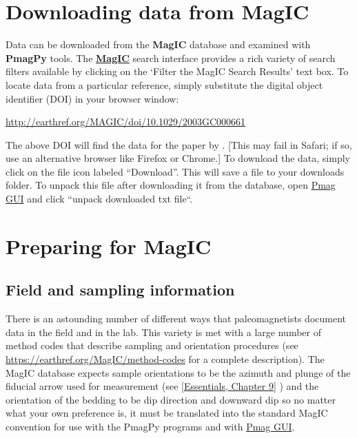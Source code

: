 \documentclass[11pt]{book}
\begin{document}
{

\section{Downloading data from {\bf MagIC}}

Data can be downloaded from the {\bf MagIC} database and examined with {\bf PmagPy} tools.   The \href{http://earthref.org/MAGIC/search/}{\bf MagIC} search interface provides a rich variety of search filters available by clicking on the `Filter the MagIC Search Results' text box.    To locate data from a particular reference,  simply substitute the digital object identifier (DOI) in your browser window:

\href{http://earthref.org/MAGIC/doi/10.1029/2003GC000661}{http://earthref.org/MAGIC/doi/10.1029/2003GC000661}

\noindent The above DOI will find the data for the paper by \cite{tauxe04b}.  [This may fail in Safari; if so, use an alternative browser like Firefox or Chrome.]     To download the data, simply click on the file icon labeled ``Download''.  This will save a file to your downloads folder.
 To unpack this file after downloading it from the database, open \href{#pmag_gui.py}{Pmag GUI} and click ``unpack downloaded txt file``.


 \section{Preparing for MagIC}


\subsection{Field and sampling information}

 There is an astounding number of different ways that paleomagnetists document data in the field and in the lab. This variety is met with a large number  of method codes that describe sampling and orientation procedures (see \url{https://earthref.org/MagIC/method-codes} for a complete description).   The MagIC database expects sample orientations to be the azimuth and plunge of the fiducial arrow used for measurement (see  \href{http://earthref.org/MAGIC/books/Tauxe/Essentials/WebBook3ch2.html#ch2}{[Essentials, Chapter 9]} )  and the orientation of the bedding to be dip direction and downward dip so no matter what your own preference is, it must be translated into the standard MagIC convention for use with the PmagPy programs and with \href{#pmag_gui.py}{Pmag GUI}.

}
\end{document}
